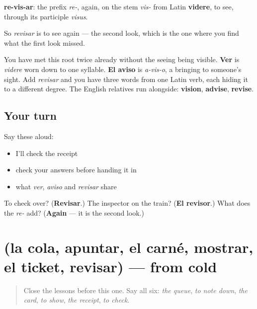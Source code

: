 \begin{cousinweb}
\textbf{re-vis-ar}: the prefix \emph{re-}, again, on the stem \emph{vis-} from Latin \textbf{videre}, to see, through its participle \emph{visus}.

So \emph{revisar} is to see again — the second look, which is the one where you find what the first look missed.

You have met this root twice already without the seeing being visible. \textbf{Ver} is \emph{videre} worn down to one syllable. \textbf{El aviso} is \emph{a-vis-o}, a bringing to someone's sight. Add \emph{revisar} and you have three words from one Latin verb, each hiding it to a different degree. The English relatives run alongside: \textbf{vision}, \textbf{advise}, \textbf{revise}.
\end{cousinweb}

\subsection*{Your turn}
Say these aloud:

\begin{itemize}
\raggedright
  \item I'll check the receipt
  \item check your answers before handing it in
  \item what \emph{ver}, \emph{aviso} and \emph{revisar} share
\end{itemize}

\begin{tcolorbox}[breakable,colback=teal!4,colframe=teal!35!black,title={Before you move on}]
To check over? (\textbf{Revisar}.) The inspector on the train? (\textbf{El revisor}.) What does the \emph{re-} add? (\textbf{Again} — it is the second look.)
\end{tcolorbox}
\section[(la cola, apuntar, el carné, mostrar …]{(la cola, apuntar, el carné, mostrar, el ticket, revisar) — from cold}

\label{lesson:ES-R451-repaso-turno}



\begin{quote}
Close the lessons before this one. Say all six: \emph{the queue}, \emph{to note down}, \emph{the card}, \emph{to show}, \emph{the receipt}, \emph{to check}.
\end{quote}

